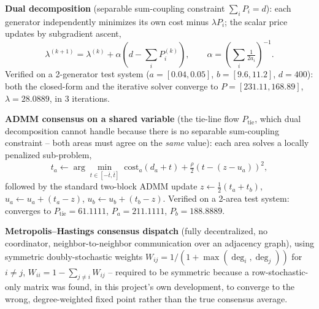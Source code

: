 \documentclass[11pt]{report}
\theoremstyle{plain}
\theoremstyle{definition}
\theoremstyle{remark}
\begin{document}
\textbf{Dual decomposition} (separable sum-coupling constraint
$\sum_i P_i=d$): each generator independently minimizes its own cost
minus $\lambda P_i$; the scalar price updates by subgradient ascent,
\begin{equation}
\lambda^{(k+1)} = \lambda^{(k)} + \alpha\left(d-\textstyle\sum_i P_i^{(k)}\right),
\qquad \alpha = \left(\textstyle\sum_i \tfrac{1}{2a_i}\right)^{-1}.
\label{eq:dual-decomp}
\end{equation}
Verified on a 2-generator test system ($a=[0.04,0.05]$, $b=[9.6,11.2]$,
$d=400$): both the closed-form and the iterative solver converge to
$P=[231.11,168.89]$, $\lambda=28.0889$, in 3 iterations.

\textbf{ADMM consensus on a shared variable} (the tie-line flow
$P_{\text{tie}}$, which dual decomposition cannot handle because there
is no separable sum-coupling constraint -- both areas must agree on the
\emph{same} value): each area solves a locally penalized sub-problem,
\begin{equation}
t_a \leftarrow \arg\min_{t\in[-\bar t,\bar t]}\; \text{cost}_a\left(d_a+t\right) + \tfrac{\rho}{2}(t-(z-u_a))^2,
\label{eq:admm}
\end{equation}
followed by the standard two-block ADMM update
$z\leftarrow\tfrac12(t_a+t_b)$, $u_a\leftarrow u_a+(t_a-z)$,
$u_b\leftarrow u_b+(t_b-z)$. Verified on a 2-area test system: converges
to $P_{\text{tie}}=61.1111$, $P_a=211.1111$, $P_b=188.8889$.

\textbf{Metropolis--Hastings consensus dispatch} (fully decentralized,
no coordinator, neighbor-to-neighbor communication over an adjacency
graph), using symmetric doubly-stochastic weights
$W_{ij}=1/(1+\max(\deg_i,\deg_j))$ for $i\ne j$, $W_{ii}=1-\sum_{j\ne i}W_{ij}$
-- required to be symmetric because a row-stochastic-only matrix was
found, in this project's own development, to converge to the wrong,
degree-weighted fixed point rather than the true consensus average.
\end{document}
